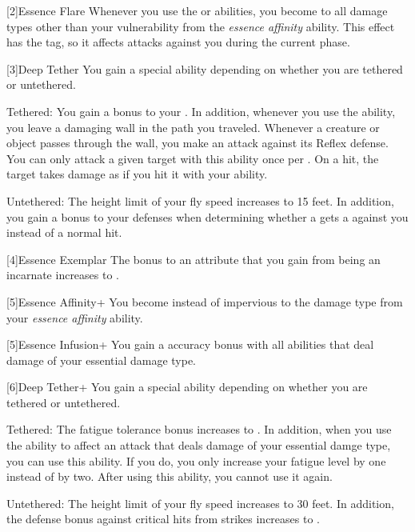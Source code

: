     [2]{Essence Flare} Whenever you use the  or  abilities, you  become \impervious to all damage types other than your vulnerability from the \textit{essence affinity} ability.
    This effect has the  tag, so it affects attacks against you during the current phase.

    [3]{Deep Tether} You gain a special ability depending on whether you are tethered or untethered.
    \begin{raggeditemize}
        \item Tethered: You gain a  bonus to your .
            In addition, whenever you use the  ability, you leave a damaging wall in the path you traveled.
            Whenever a creature or object passes through the wall, you make an attack against its Reflex defense.
            You can only attack a given target with this ability once per .
            On a hit, the target takes damage as if you hit it with your  ability.
        \item Untethered: The height limit of your fly speed increases to 15 feet.
            In addition, you gain a  bonus to your defenses when determining whether a  gets a  against you instead of a normal hit.
    \end{raggeditemize}

    [4]{Essence Exemplar} The bonus to an attribute that you gain from being an incarnate increases to .

    [5]{Essence Affinity+} You become  instead of impervious to the damage type from your \textit{essence affinity} ability.

    [5]{Essence Infusion+} You gain a  accuracy bonus with all abilities that deal damage of your essential damage type.

    [6]{Deep Tether+} You gain a special ability depending on whether you are tethered or untethered.
    \begin{raggeditemize}
        \item Tethered: The fatigue tolerance bonus increases to .
            In addition, when you use the  ability to affect an attack that deals damage of your essential damge type, you can use this ability.
            If you do, you only increase your fatigue level by one instead of by two.
            After using this ability, you  cannot use it again.
        \item Untethered: The height limit of your fly speed increases to 30 feet.
            In addition, the defense bonus against critical hits from strikes increases to .
    \end{raggeditemize}

